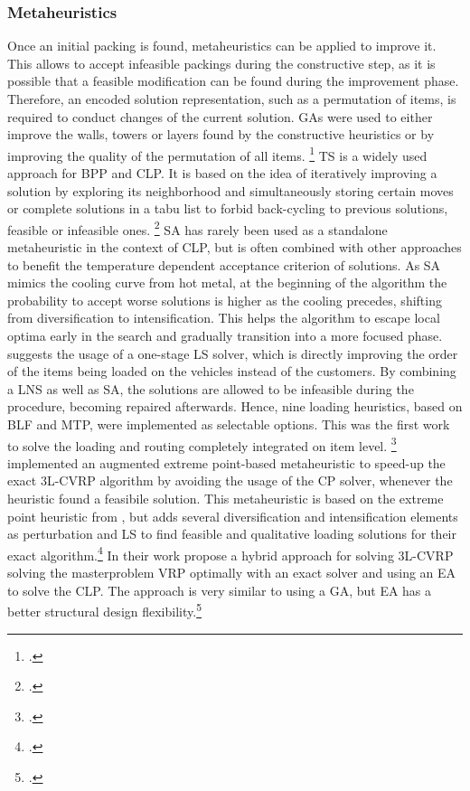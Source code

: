 \subsubsection{Metaheuristics}
Once an initial packing is found, metaheuristics can be applied to improve it.
This allows to accept infeasible packings during the constructive step,
as it is possible that a feasible modification can be found during the improvement phase.
Therefore, an encoded solution representation, such as a permutation of items, is required
to conduct changes of the current solution. \Glspl{GA} were
used to either improve the walls, towers or layers found by the constructive heuristics
or by improving the quality of the permutation of all items. \footcite[cf.][]{gehring_genetic_1997}
\Gls{TS} is a widely used approach for \gls{BPP} and \gls{CLP}. It is based on
the idea of iteratively improving a solution by exploring its neighborhood and simultaneously
storing certain moves or complete solutions in a tabu list to forbid back-cycling to
previous solutions, feasible or infeasible ones. \footcite[cf.][pp. 344--345]{gendreau_tabu_2006}
\Gls{SA} has rarely been used as a standalone metaheuristic in the context of \gls{CLP}, but is often
combined with other approaches to benefit the temperature dependent acceptance criterion of
solutions. As \gls{SA} mimics the cooling curve from hot metal, at the beginning of the algorithm the probability
to accept worse solutions is higher as the cooling precedes, shifting from diversification to
intensification. This helps the algorithm to escape local optima
early in the search and gradually transition into a more focused phase. \cite{ceschia_local_2013} suggests
the usage of a one-stage \gls{LS} solver, which is directly improving the order of the items being
loaded on the vehicles instead of the customers. By combining a \gls{LNS} as
well as \gls{SA}, the solutions are allowed to be infeasible during the procedure, becoming repaired afterwards.
Hence, nine loading heuristics, based on \gls{BLF} and \gls{MTP}, were implemented as selectable options.
This was the first work to
solve the loading and routing completely integrated on item level. \footcite[cf.][pp. 1142-1145]{ceschia_local_2013}
\cite{tamke_branch-and-cut_2024} implemented an augmented extreme point-based metaheuristic
to speed-up the exact \gls{3L-CVRP} algorithm by avoiding the usage of the \gls{CP} solver, whenever the heuristic
found a feasibile solution. This metaheuristic is based on the extreme point heuristic from \cite{zhang_evolutionary_2015},
but adds several diversification and intensification elements as perturbation and \gls{LS} to find
feasible and qualitative loading solutions for their exact algorithm.\footcite[cf.][pp. 11-13]{tamke_branch-and-cut_2024}
In their work \cite{kucuk_constraint_2022} propose a hybrid approach for solving \gls{3L-CVRP} solving the
masterproblem \gls{VRP} optimally with an exact solver and using an \gls{EA}
to solve the \gls{CLP}. The approach is very similar to using a \gls{GA}, but \gls{EA}
has a better structural design flexibility.\footcite[cf.][pp. 5--8]{kucuk_constraint_2022}

